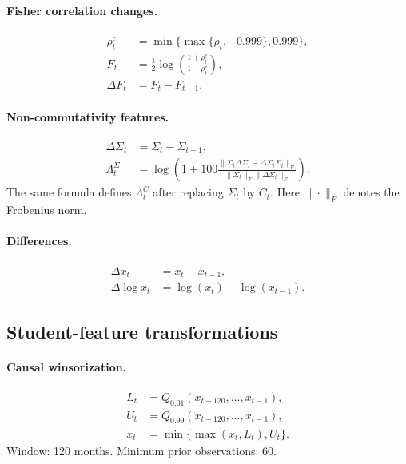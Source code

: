 \paragraph{Fisher correlation changes.}
\begin{align}
\rho_t^{c}
&=
\min\{\max\{\rho_t,-0.999\},0.999\}, \\
F_t
&=
\frac{1}{2}\log\!\left(\frac{1+\rho_t^{c}}{1-\rho_t^{c}}\right), \\
\Delta F_t
&=
F_t-F_{t-1}.
\end{align}

\paragraph{Non-commutativity features.}
\begin{align}
\Delta\Sigma_t
&=
\Sigma_t-\Sigma_{t-1}, \\
\Lambda^{\Sigma}_t
&=
\log\!\left(
1+
100
\frac{
\|\Sigma_t\Delta\Sigma_t-\Delta\Sigma_t\Sigma_t\|_F
}{
\|\Sigma_t\|_F\|\Delta\Sigma_t\|_F
}
\right).
\end{align}
The same formula defines \(\Lambda^{C}_t\) after replacing \(\Sigma_t\) by \(C_t\). Here \(\|\cdot\|_F\) denotes the Frobenius norm.

\paragraph{Differences.}
\begin{align}
\Delta x_t
&=
x_t-x_{t-1}, \\
\Delta\log x_t
&=
\log(x_t)-\log(x_{t-1}).
\end{align}

\subsection{Student-feature transformations}
\label{app:student-feature-transformations}

\paragraph{Causal winsorization.}
\begin{align}
L_t
&=
Q_{0.01}(x_{t-120},\ldots,x_{t-1}), \\
U_t
&=
Q_{0.99}(x_{t-120},\ldots,x_{t-1}), \\
\widetilde{x}_t
&=
\min\{\max(x_t,L_t),U_t\}.
\end{align}
Window: 120 months. Minimum prior observations: 60.

